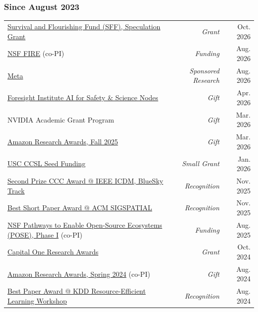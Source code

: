 \documentclass[margin,line,pifont,palatino,courier]{res}
\begin{document}
\begin{resume}
\subsubsection*{Since August 2023}
\vspace{-0.2in}
\begin{tabularx}{\textwidth}{@{}Xr@{\hskip 0.2in}r@{}}
\href{https://survivalandflourishing.fund/}{Survival and Flourishing Fund (SFF), Speculation Grant} & \textit{Grant} & \hfill Oct. 2026 \\
\href{https://www.nsf.gov/awardsearch/show-award/?AWD_ID=2623936}{NSF FIRE} (co-PI) & \textit{Funding} & \hfill Aug. 2026 \\
\href{https://research.facebook.com/}{Meta} & \textit{Sponsored Research} & \hfill Aug. 2026 \\
\href{https://foresight.org/grantees/2026-yue-zhao/}{Foresight Institute AI for Safety \& Science Nodes} & \textit{Gift} & \hfill Apr. 2026 \\
NVIDIA Academic Grant Program & \textit{Gift} & \hfill Mar. 2026 \\
\href{https://www.amazon.science/research-awards/recipients/yue-zhao}{Amazon Research Awards, Fall 2025} & \textit{Gift} & \hfill Mar. 2026 \\
\href{https://dornsife.usc.edu/ccls/news/}{USC CCSL Seed Funding} & \textit{Small Grant} & \hfill Jan. 2026 \\
\href{https://cccblog.org/2025/12/19/announcing-blue-sky-track-winners-at-icdm-2025/}{Second Prize CCC Award @ IEEE ICDM, BlueSky Track} & \textit{Recognition} & \hfill Nov. 2025 \\
\href{https://www.sigspatial.org/people/award-recipients/}{Best Short Paper Award @ ACM SIGSPATIAL} & \textit{Recognition} & \hfill Nov. 2025 \\
\href{https://www.nsf.gov/awardsearch/show-award/?AWD_ID=2449280}{NSF Pathways to Enable Open-Source Ecosystems (POSE), Phase I} (co-PI) & \textit{Funding} & \hfill Aug. 2025 \\
\href{https://www.capitalone.com/tech/ai/credif-spring-2025-ai-award-fellowship-recipients/}{Capital One Research Awards} & \textit{Grant} & \hfill Oct. 2024 \\
\href{https://www.amazon.science/research-awards/recipients/yue-zhao}{Amazon Research Awards, Spring 2024} (co-PI) & \textit{Gift} & \hfill Aug. 2024 \\
\href{https://chuxuzhang.github.io/RelKD/}{Best Paper Award @ KDD Resource-Efficient Learning Workshop} & \textit{Recognition} & \hfill Aug. 2024 \\

\end{tabularx}
\end{resume}
\end{document}
